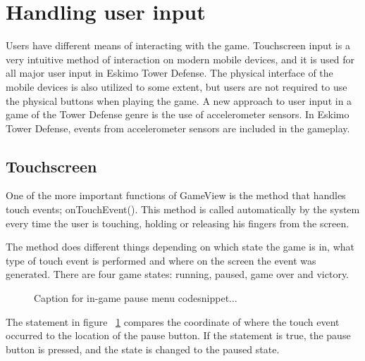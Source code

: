 \section{Handling user input}

Users have different means of interacting with the game. Touchscreen input is a very intuitive method of interaction on modern mobile devices, and it is used for all major user input in Eskimo Tower Defense. The physical interface of the mobile devices is also utilized to some extent, but users are not required to use the physical buttons when playing the game. A new approach to user input in a game of the Tower Defense genre is the use of accelerometer sensors. In Eskimo Tower Defense, events from accelerometer sensors are included in the gameplay.

\subsection{Touchscreen}

One of the more important functions of GameView is the method that handles touch events; onTouchEvent(). This method is called automatically by the system every time the user is touching, holding or releasing his fingers from the screen. 

The method does different things depending on which state the game is in, what type of touch event is performed and where on the screen the event was generated. There are four game states: running, paused, game over and victory.


\begin{figure}[htb]

\begin{small}

\end{small}

\caption{Caption for in-game pause menu codesnippet...}
\label{fig:codeExIn-GamePauseMenu}

\end{figure}


The statement in figure ~\ref{fig:codeExIn-GamePauseMenu} compares the coordinate of where the touch event occurred to the location of the pause button. If the statement is true, the pause button is pressed, and the state is changed to the paused state.

